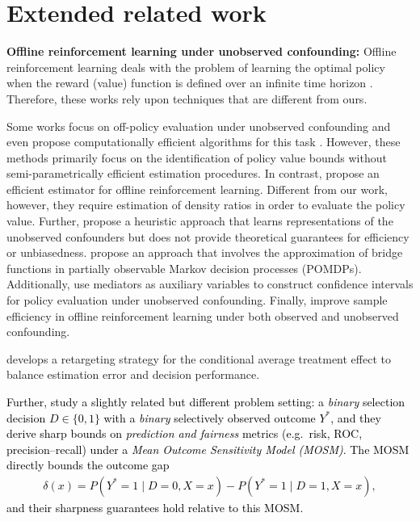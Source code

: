 \documentclass{article} %
\theoremstyle{plain}
\theoremstyle{definition}
\theoremstyle{remark}
\newcommand{\rebuttal}[1]{\textcolor{black}{#1}}
\begin{document}


\clearpage

\appendix

\section{Extended related work}\label{app:rw}


\textbf{Offline reinforcement learning under unobserved confounding:} Offline reinforcement learning deals with the problem of learning the optimal policy when the reward (value) function is defined over an infinite time horizon \citep{Javurek.2026}. Therefore, these works rely upon techniques that are different from ours.

Some works focus on off-policy evaluation under unobserved confounding \citep{Bennett.2021,Kallus.2020d} and even propose computationally efficient algorithms for this task \citep{Kausik.2024}. However, these methods primarily focus on the identification of policy value bounds without semi-parametrically efficient estimation procedures. In contrast, \citet{Bennet.2024} propose an efficient estimator for offline reinforcement learning. Different from our work, however, they require estimation of density ratios in order to evaluate the policy value. Further, \citet{Pace.2024} propose a heuristic approach that learns representations of the unobserved confounders but does not provide theoretical guarantees for efficiency or unbiasedness. \citet{Shi.2022b} propose an approach that involves the approximation of bridge functions in partially observable Markov decision processes (POMDPs). Additionally, \citet{shi.2024} use mediators as auxiliary variables to construct confidence intervals for policy evaluation under unobserved confounding. Finally, \citet{wang.2021c} improve sample efficiency in offline reinforcement learning under both observed and unobserved confounding.

\citet{Frauen.2025c} develops a retargeting strategy for the conditional average treatment effect to balance estimation error and decision performance.

\rebuttal{Further, \citet{Rambachan.2025} study a slightly related but different problem setting: a \emph{binary} selection decision $D\in\{0,1\}$ with a \emph{binary} selectively observed outcome $Y^\ast$, and they derive sharp bounds on \emph{prediction and fairness} metrics (e.g.\ risk, ROC, precision--recall) under a \emph{Mean Outcome Sensitivity Model (MOSM)}. The MOSM directly bounds the outcome gap 
\begin{align}
\delta(x)=P(Y^\ast=1\mid D=0,X=x)-P(Y^\ast=1\mid D=1,X=x),
\end{align}
and their sharpness guarantees hold relative to this MOSM.}
\end{document}
